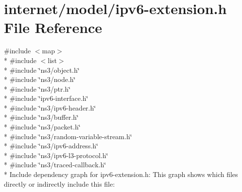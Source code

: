 \hypertarget{ipv6-extension_8h}{}\section{internet/model/ipv6-\/extension.h File Reference}
\label{ipv6-extension_8h}
{\ttfamily \#include $<$map$>$}\\*
{\ttfamily \#include $<$list$>$}\\*
{\ttfamily \#include \char`\"{}ns3/object.\+h\char`\"{}}\\*
{\ttfamily \#include \char`\"{}ns3/node.\+h\char`\"{}}\\*
{\ttfamily \#include \char`\"{}ns3/ptr.\+h\char`\"{}}\\*
{\ttfamily \#include \char`\"{}ipv6-\/interface.\+h\char`\"{}}\\*
{\ttfamily \#include \char`\"{}ns3/ipv6-\/header.\+h\char`\"{}}\\*
{\ttfamily \#include \char`\"{}ns3/buffer.\+h\char`\"{}}\\*
{\ttfamily \#include \char`\"{}ns3/packet.\+h\char`\"{}}\\*
{\ttfamily \#include \char`\"{}ns3/random-\/variable-\/stream.\+h\char`\"{}}\\*
{\ttfamily \#include \char`\"{}ns3/ipv6-\/address.\+h\char`\"{}}\\*
{\ttfamily \#include \char`\"{}ns3/ipv6-\/l3-\/protocol.\+h\char`\"{}}\\*
{\ttfamily \#include \char`\"{}ns3/traced-\/callback.\+h\char`\"{}}\\*
Include dependency graph for ipv6-\/extension.h\+:
This graph shows which files directly or indirectly include this file\+:
